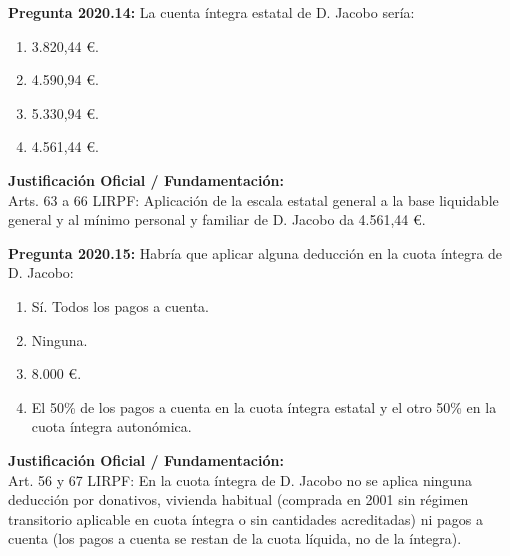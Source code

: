 \documentclass[11pt,a4paper,openany]{article}
\begin{document}
\noindent\textbf{\sffamily Pregunta 2020.14:} La cuenta íntegra estatal de D. Jacobo sería:\\[0.15cm]
\begin{enumerate}[label=\textbf{\alph*)},leftmargin=1.8em,itemsep=1.5pt,topsep=2pt,partopsep=0pt,parsep=0pt]
    \item 3.820,44 \euro{}.
    \item 4.590,94 \euro{}.
    \item 5.330,94 \euro{}.
    \item 4.561,44 \euro{}.
\end{enumerate}
\begin{solucionBox}
\textbf{Justificación Oficial / Fundamentación:}\\[0.1cm]
Arts. 63 a 66 LIRPF: Aplicación de la escala estatal general a la base liquidable general y al mínimo personal y familiar de D. Jacobo da 4.561,44 \euro{}.
\end{solucionBox}
\vspace{0.35cm}

\noindent\textbf{\sffamily Pregunta 2020.15:} Habría que aplicar alguna deducción en la cuota íntegra de D. Jacobo:\\[0.15cm]
\begin{enumerate}[label=\textbf{\alph*)},leftmargin=1.8em,itemsep=1.5pt,topsep=2pt,partopsep=0pt,parsep=0pt]
    \item Sí. Todos los pagos a cuenta.
    \item Ninguna.
    \item 8.000 \euro{}.
    \item El 50\% de los pagos a cuenta en la cuota íntegra estatal y el otro 50\% en la cuota íntegra autonómica.
\end{enumerate}
\begin{solucionBox}
\textbf{Justificación Oficial / Fundamentación:}\\[0.1cm]
Art. 56 y 67 LIRPF: En la cuota íntegra de D. Jacobo no se aplica ninguna deducción por donativos, vivienda habitual (comprada en 2001 sin régimen transitorio aplicable en cuota íntegra o sin cantidades acreditadas) ni pagos a cuenta (los pagos a cuenta se restan de la cuota líquida, no de la íntegra).
\end{solucionBox}
\vspace{0.35cm}
\end{document}
